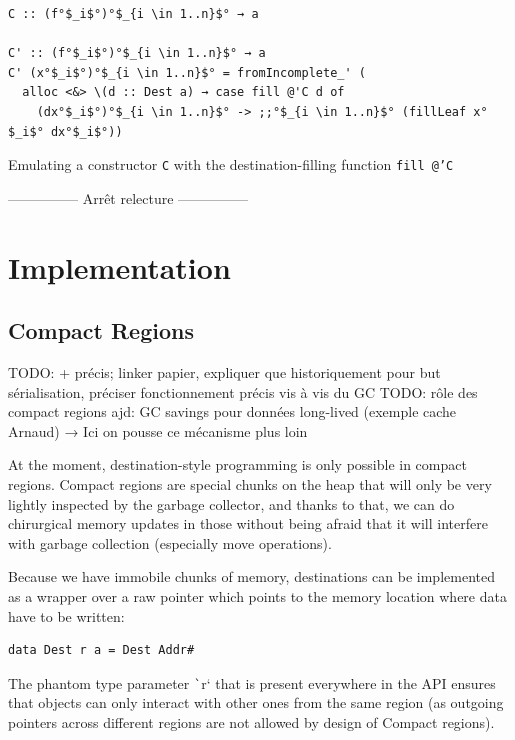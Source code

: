 \documentclass[english]{jflart}
\newcommand{\TODO}[1]{{\color{red}\large #1}}
\begin{document}
\begin{table}[t]
\small
\begin{verbatim}
C :: (f°$_i$°)°$_{i \in 1..n}$° → a

C' :: (f°$_i$°)°$_{i \in 1..n}$° → a
C' (x°$_i$°)°$_{i \in 1..n}$° = fromIncomplete_' (
  alloc <&> \(d :: Dest a) → case fill @'C d of
    (dx°$_i$°)°$_{i \in 1..n}$° -> ;;°$_{i \in 1..n}$° (fillLeaf x°$_i$° dx°$_i$°))
\end{verbatim}
\caption{Emulating a constructor \texttt{C} with the destination-filling function \texttt{fill @'C}}
\label{table:emulate-ctor}
\end{table}

\clearpage{}

\TODO{--------------- Arrêt relecture ---------------}

\section{Implementation}\label{sec:implementation}

\subsection{Compact Regions}\label{ssec:impl-compact-regions}

TODO: + précis; linker papier, expliquer que historiquement pour but sérialisation, préciser fonctionnement précis vis à vis du GC
TODO: rôle des compact regions ajd: GC savings pour données long-lived (exemple cache Arnaud) → Ici on pousse ce mécanisme plus loin

At the moment, destination-style programming is only possible in compact regions. Compact regions are special chunks on the heap that will only be very lightly inspected by the garbage collector, and thanks to that, we can do chirurgical memory updates in those without being afraid that it will interfere with garbage collection (especially move operations).

Because we have immobile chunks of memory, destinations can be implemented as a wrapper over a raw pointer which points to the memory location where data have to be written:

{\small
\begin{verbatim}
data Dest r a = Dest Addr#
\end{verbatim}
}

The phantom type parameter \texttt`r` that is present everywhere in the API ensures that objects can only interact with other ones from the same region (as outgoing pointers across different regions are not allowed by design of Compact regions).
\end{document}
